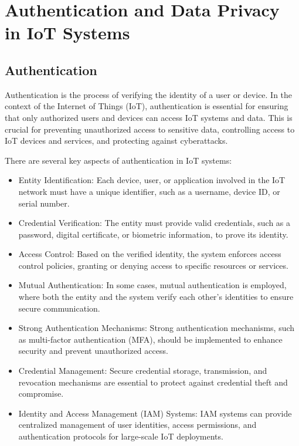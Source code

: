 \documentclass[conference]{IEEEtran}
\begin{document}
\section{Authentication and Data Privacy in IoT Systems}
\subsection{Authentication}

Authentication is the process of verifying the identity of a user or device. In the context of the Internet of Things (IoT), authentication is essential for ensuring that only authorized users and devices can access IoT systems and data. This is crucial for preventing unauthorized access to sensitive data, controlling access to IoT devices and services, and protecting against cyberattacks.

There are several key aspects of authentication in IoT systems:

\begin{itemize}
    \item Entity Identification: Each device, user, or application involved in the IoT network must have a unique identifier, such as a username, device ID, or serial number.
    \item Credential Verification: The entity must provide valid credentials, such as a password, digital certificate, or biometric information, to prove its identity.
    \item Access Control: Based on the verified identity, the system enforces access control policies, granting or denying access to specific resources or services.
    \item Mutual Authentication: In some cases, mutual authentication is employed, where both the entity and the system verify each other's identities to ensure secure communication.
    \item Strong Authentication Mechanisms: Strong authentication mechanisms, such as multi-factor authentication (MFA), should be implemented to enhance security and prevent unauthorized access.
    \item Credential Management: Secure credential storage, transmission, and revocation mechanisms are essential to protect against credential theft and compromise.
    \item Identity and Access Management (IAM) Systems: IAM systems can provide centralized management of user identities, access permissions, and authentication protocols for large-scale IoT deployments.
\end{itemize}
\end{document}
